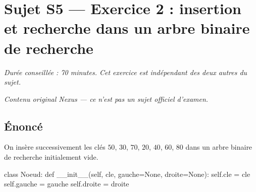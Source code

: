 \section*{Sujet S5 --- Exercice 2 : insertion et recherche dans un arbre binaire de recherche}

\textit{Durée conseillée : 70 minutes. Cet exercice est indépendant des deux
autres du sujet.}

\medskip
\textit{Contenu original Nexus --- ce n'est pas un sujet officiel d'examen.}

\subsection*{Énoncé}

On insère successivement les clés $50$, $30$, $70$, $20$, $40$, $60$, $80$ dans
un arbre binaire de recherche initialement vide.

\begin{python}
class Noeud:
    def __init__(self, cle, gauche=None, droite=None):
        self.cle = cle
        self.gauche = gauche
        self.droite = droite
\end{python}

